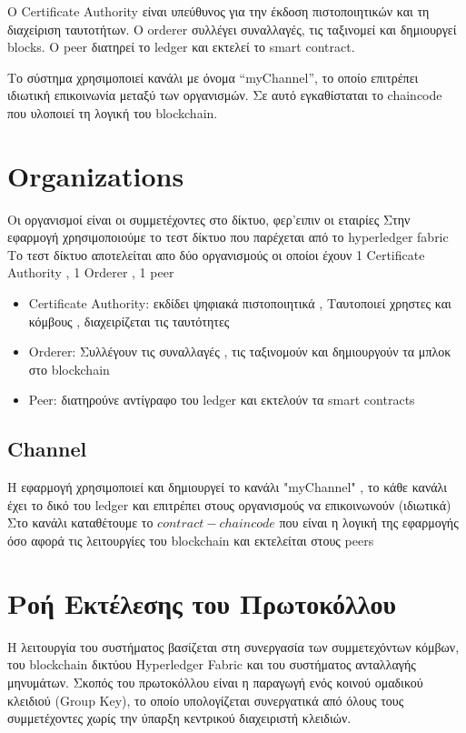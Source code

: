 \documentclass[12pt,a4paper]{report}
\begin{document}
Ο Certificate Authority είναι υπεύθυνος για την έκδοση πιστοποιητικών και τη διαχείριση ταυτοτήτων. Ο orderer συλλέγει συναλλαγές, τις ταξινομεί και δημιουργεί blocks. Ο peer διατηρεί το ledger και εκτελεί το smart contract.

Το σύστημα χρησιμοποιεί κανάλι με όνομα “myChannel”, το οποίο επιτρέπει ιδιωτική επικοινωνία μεταξύ των οργανισμών. Σε αυτό εγκαθίσταται το chaincode που υλοποιεί τη λογική του blockchain.
	\section{Organizations}
	Οι οργανισμοί είναι οι συμμετέχοντες στο δίκτυο, φερ'ειπιν οι εταιρίες
	Στην εφαρμογή χρησιμοποιούμε το τεστ δίκτυο που παρέχεται από το hyperledger fabric
	Το τεστ δίκτυο αποτελείται απο δύο οργανισμούς οι οποίοι έχουν 1 Certificate Authority , 1 Orderer , 1 peer
	\begin{itemize}
		\item Certificate Authority: εκδίδει ψηφιακά πιστοποιητικά , Ταυτοποιεί χρηστες και κόμβους , διαχειρίζεται τις ταυτότητες
		\item Orderer: Συλλέγουν τις συναλλαγές , τις ταξινομούν και δημιουργούν τα μπλοκ στο blockchain
		\item Peer: διατηρούνε αντίγραφο του ledger και εκτελούν τα smart contracts
	\end{itemize}
	\subsection*{Channel}
	Η εφαρμογή χρησιμοποιεί και δημιουργεί το κανάλι "myChannel"
	, το κάθε κανάλι έχει το δικό του ledger και επιτρέπει στους οργανισμούς να επικοινωνούν (ιδιωτικά)
	Στο κανάλι καταθέτουμε το $contract - chaincode$ που είναι η λογική της εφαρμογής όσο αφορά τις λειτουργίες του blockchain και εκτελείται στους peers

\section{Ροή Εκτέλεσης του Πρωτοκόλλου}

Η λειτουργία του συστήματος βασίζεται στη συνεργασία των συμμετεχόντων
κόμβων, του blockchain δικτύου Hyperledger Fabric και του συστήματος
ανταλλαγής μηνυμάτων. Σκοπός του πρωτοκόλλου είναι η παραγωγή ενός
κοινού ομαδικού κλειδιού (Group Key), το οποίο υπολογίζεται
συνεργατικά από όλους τους συμμετέχοντες χωρίς την ύπαρξη κεντρικού
διαχειριστή κλειδιών.
\end{document}
